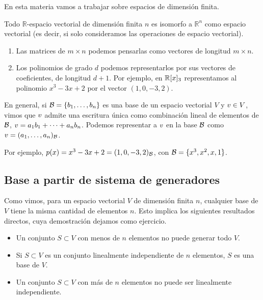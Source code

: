 En esta materia vamos a trabajar sobre espacios de dimensión finita.

\begin{prop}
 Todo $\mathbb{R}$-espacio vectorial de dimensión finita $n$ es isomorfo a $\mathbb{R}^n$ como espacio vectorial (es decir, si solo consideramos las operaciones de espacio vectorial).
 \end{prop}

\begin{ejemplo} \leavevmode
\begin{enumerate}
\item Las matrices de $m \times n$ podemos pensarlas como vectores de longitud $m \times n$.
\item Los polinomios de grado $d$ podemos representarlos por sus vectores de coeficientes, de longitud $d + 1$. Por ejemplo, en $\mathbb R[x]_3$ representamos al polinomio $x^3 -3x + 2$ por el vector $(1, 0, -3, 2)$.
\end{enumerate}
\end{ejemplo}

En general, si $\B = \{\bb_1, \dots, \bb_n\}$ es una base de un espacio vectorial $V$ y $\vb \in V$, vimos que $\vb$ admite una escritura única como combinación lineal de elementos de $\mathcal B$, $\vb = a_1 \bb_1 + \dots + a_n \bb_n$. Podemos representar a $\vb$ en la base $\mathcal B$ como $\vb = (a_1, \dots, a_n)_{\B}$.

Por ejemplo, $p(x) = x^3-3x+2 = (1, 0, -3, 2)_{\mathcal B}$, con $\mathcal B= \{x^3, x^2, x, 1\}$.

\subsection{Base a partir de sistema de generadores}

Como vimos, para un espacio vectorial $V$ de dimensión finita $n$, cualquier base de $V$ tiene la misma cantidad de elementos $n$.
Esto implica los siguientes resultados directos, cuya demostración dejamos como ejercicio.
\begin{itemize}
\item Un conjunto $S \subset V$ con menos de $n$ elementos no puede generar todo $V$.
\item Si $S \subset V$ es un conjunto linealmente independiente de $n$ elementos, $S$ es una base de $V$.
\item Un conjunto $S \subset V$ con más de $n$ elementos no puede ser linealmente independiente.
\end{itemize}


